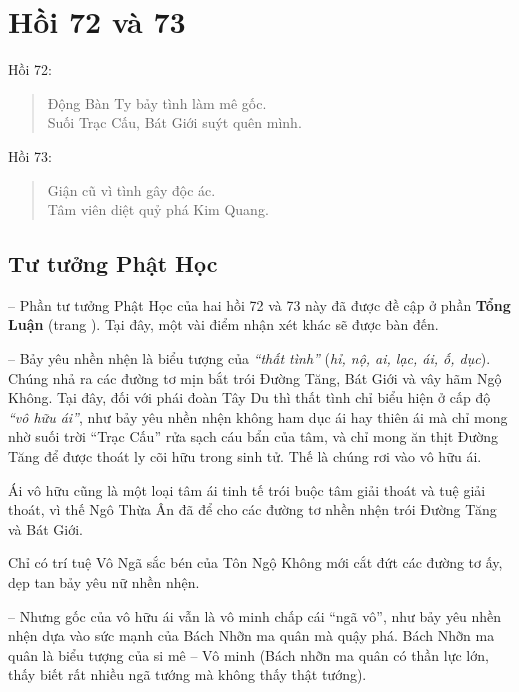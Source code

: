 \chapter{Hồi 72 và 73} %
\label{cha:hoi_72_73}

Hồi 72:

\begin{verse}
\begin{itshape}
Động Bàn Ty bảy tình làm mê gốc.\\
Suối Trạc Cấu, Bát Giới suýt quên mình.
\end{itshape}
\end{verse}

Hồi 73:

\begin{verse}
\begin{itshape}
Giận cũ vì tình gây độc ác.\\
Tâm viên diệt quỷ phá Kim Quang.
\end{itshape}
\end{verse}

\section{Tư tưởng Phật Học} %
\label{sec:72_73_phat_hoc}

-- Phần tư tưởng Phật Học của hai hồi 72 và 73 này đã được đề cập ở phần {\bf Tổng Luận} (trang \pageref{sec:bieu_tuong_hoi_54_64_va_72}). Tại đây, một vài điểm nhận xét khác sẽ được bàn đến.

-- Bảy yêu nhền nhện là biểu tượng của \emph{``thất tình''} (\emph{hỉ, nộ, ai, lạc, ái, ố, dục}). Chúng nhả ra các đường tơ mịn bắt trói Đường Tăng, Bát Giới và vây hãm Ngộ Không. Tại đây, đối với phái đoàn Tây Du thì thất tình chỉ biểu hiện ở cấp độ \emph{``vô hữu ái''}, như bảy yêu nhền nhện không ham dục ái hay thiên ái mà chỉ mong nhờ suối trời ``Trạc Cấu'' rửa sạch cáu bẩn của tâm, và chỉ mong ăn thịt Đường Tăng để được thoát ly cõi hữu trong sinh tử. Thế là chúng rơi vào vô hữu ái.

Ái vô hữu cũng là một loại tâm ái tinh tế trói buộc tâm giải thoát và tuệ giải thoát, vì thế Ngô Thừa Ân đã để cho các đường tơ nhền nhện trói Đường Tăng và Bát Giới.

Chỉ có trí tuệ Vô Ngã sắc bén của Tôn Ngộ Không mới cắt đứt các đường tơ ấy, dẹp tan bảy yêu nữ nhền nhện.

-- Nhưng gốc của vô hữu ái vẫn là vô minh chấp cái ``ngã vô'', như bảy yêu nhền nhện dựa vào sức mạnh của Bách Nhỡn ma quân mà quậy phá. Bách Nhỡn ma quân là biểu tượng của si mê -- Vô minh (Bách nhỡn ma quân có thần lực lớn, thấy biết rất nhiều ngã tướng mà không thấy thật tướng).


